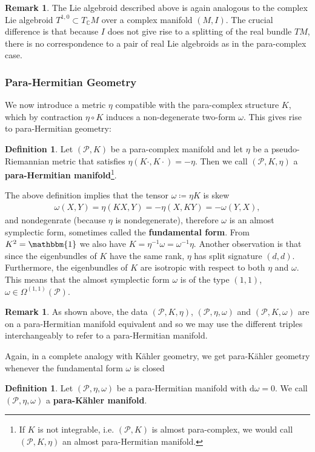 \documentclass[letterpaper,12pt]{article}
\newcommand{\id}{\mathbbm{1}}
\newcommand{\PS}{\mathcal{P}}
\newcommand{\rd}{\mathrm{d}}
\theoremstyle{definition}
\newtheorem{Def}[theorem]{Definition}
\newtheorem{remark}[theorem]{Remark}
\theoremstyle{remark}
\theoremstyle{examples}
\begin{document}
\begin{remark}
The Lie algebroid described above is again analogous to the complex Lie algebroid $T^{1,0}\subset T_{\mathbb{C}}M$ over a complex manifold $(M,I)$. The crucial difference is that because $I$ does not give rise to a splitting of the real bundle $TM$, there is no correspondence to a pair of real Lie algebroids as in the para-complex case.
\end{remark}


\subsubsection{Para-Hermitian Geometry}
We now introduce a metric $\eta$ compatible with the para-complex structure $K$, which by contraction $\eta \circ  K$ induces a non-degenerate two-form $\omega$. This gives rise to para-Hermitian geometry:
\begin{Def}
	Let $(\PS,K)$ be a para-complex manifold and let $\eta$ be a pseudo-Riemannian metric that satisfies $\eta(K\cdot,K\cdot)=-\eta$. Then we call $(\PS,K,\eta)$ a \textbf{para-Hermitian manifold}\footnote{If $K$ is not integrable, i.e. $(\PS,K)$ is almost para-complex, we would call $(\PS,K,\eta)$ an almost para-Hermitian manifold.}.
\end{Def}
\noindent
The above definition implies that the tensor $\omega\coloneqq \eta K$ is skew
\begin{align*}
\omega(X,Y)=\eta(KX,Y)=-\eta(X,KY)=-\omega(Y,X),
\end{align*}
and nondegenrate (because $\eta$ is nondegenerate), therefore $\omega$ is an almost symplectic form, sometimes called the \textbf{fundamental form}. From $K^2=\id$ we also have $K=\eta^{-1}\omega=\omega^{-1}\eta$. Another observation is that since the eigenbundles of $K$ have the same rank, $\eta$ has split signature $(d,d)$. Furthermore, the eigenbundles of $K$ are isotropic with respect to both $\eta$ and $\omega$. This means that the almost symplectic form $\omega$ is of the type $(1,1)$, $\omega \in \Omega^{(1,1)}(\PS)$.
\begin{remark}
	As shown above, the data $(\PS,K,\eta)$, $(\PS,\eta,\omega)$ and $(\PS,K,\omega)$ are on a para-Hermitian manifold equivalent and so we may use the different triples interchangeably to refer to a para-Hermitian manifold.
\end{remark}
Again, in a complete analogy with K\"ahler geometry, we get para-K\"ahler geometry whenever the fundamental form $\omega$ is closed
\begin{Def}
	Let $(\PS,\eta,\omega)$ be a para-Hermitian manifold with $\rd\omega=0$. We call $(\PS,\eta,\omega)$ a \textbf{para-K\"ahler manifold}.
\end{Def}
\end{document}
